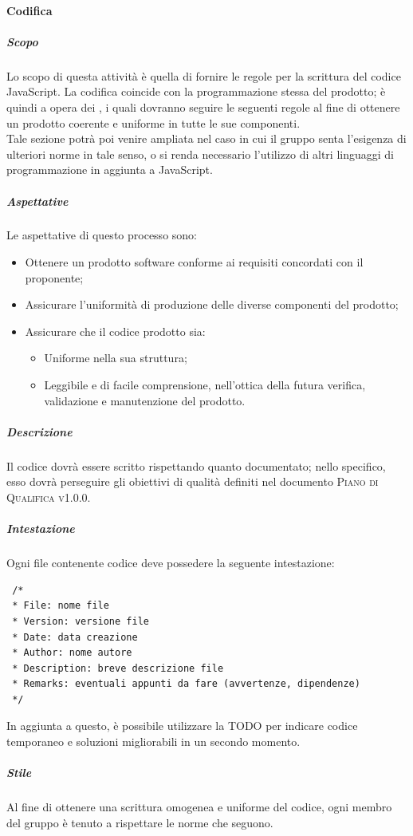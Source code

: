 \documentclass[../norme-di-progetto.tex]{subfiles}
\begin{document}
\paragraph{Codifica}
\subparagraph{Scopo}
Lo scopo di questa attività è quella di fornire le regole per la scrittura del codice JavaScript. La codifica coincide con la programmazione stessa del prodotto; è quindi a opera dei , i quali dovranno seguire le seguenti regole al fine di ottenere un prodotto coerente e uniforme in tutte le sue componenti. \\
Tale sezione potrà poi venire ampliata nel caso in cui il gruppo senta l'esigenza di ulteriori norme in tale senso, o si renda necessario l'utilizzo di altri linguaggi di programmazione in aggiunta a JavaScript.
\subparagraph{Aspettative}
Le aspettative di questo processo sono:
\begin{itemize}
  \item Ottenere un prodotto software conforme ai requisiti concordati con il proponente;
  \item Assicurare l'uniformità di produzione delle diverse componenti del prodotto;
  \item Assicurare che il codice prodotto sia:
  \begin{itemize}
    \item Uniforme nella sua struttura;
    \item Leggibile e di facile comprensione, nell'ottica della futura verifica, validazione e manutenzione del prodotto.
  \end{itemize}
\end{itemize}
\subparagraph{Descrizione}
Il codice dovrà essere scritto rispettando quanto documentato; nello specifico, esso dovrà perseguire gli obiettivi di qualità definiti nel documento \textsc{Piano di Qualifica v1.0.0}.

\subparagraph{Intestazione}
Ogni file contenente codice deve possedere la seguente intestazione:
\begin{lstlisting}
 /*
 * File: nome file
 * Version: versione file
 * Date: data creazione
 * Author: nome autore
 * Description: breve descrizione file
 * Remarks: eventuali appunti da fare (avvertenze, dipendenze)
 */
\end{lstlisting}
In aggiunta a questo, è possibile utilizzare la  TODO per indicare codice temporaneo e soluzioni migliorabili in un secondo momento.

\subparagraph{Stile}
Al fine di ottenere una scrittura omogenea e uniforme del codice, ogni membro del gruppo è tenuto a rispettare le norme che seguono.
\end{document}
